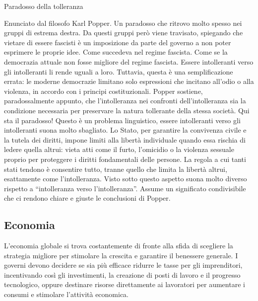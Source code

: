 \documentclass[12pt]{book} %
\begin{document}
\begin{mdframed}[linewidth=1pt]
Paradosso della tolleranza

Enunciato dal filosofo Karl Popper. Un paradosso che ritrovo molto spesso nei gruppi di estrema destra. Da questi
gruppi però viene travisato, spiegando che vietare di essere fascisti è un imposizione da parte del governo a non poter
esprimere le proprie idee. Come succedeva nel regime fascista. Come se la democrazia attuale non fosse migliore del
regime fascista. Essere intolleranti verso gli intolleranti li rende uguali a loro. 
Tuttavia, questa è una semplificazione errata: le moderne democrazie limitano solo espressioni che incitano all’odio o alla violenza, in accordo con i principi costituzionali.
Popper sostiene, paradossalmente appunto, che l'intolleranza nei confronti dell'intolleranza sia la condizione necessaria per preservare la natura tollerante della stessa società. Qui sta il paradosso! Questo è un problema linguistico, essere intolleranti verso gli intolleranti suona molto sbagliato. Lo Stato, per garantire la convivenza civile e la tutela dei diritti, impone limiti alla libertà individuale quando essa rischia di ledere quella altrui: vieta atti come il furto, l’omicidio o la violenza sessuale proprio per proteggere i diritti fondamentali delle persone. La regola a cui tanti stati tendono è consentire tutto, tranne quello che limita la libertà altrui, esattamente come l'intolleranza. Visto sotto questo aspetto suona molto diverso rispetto a “intolleranza verso l'intolleranza”. Assume un significato condivisibile che ci rendono chiare e giuste le conclusioni di Popper.
\end{mdframed}

\subsection{Economia}
L'economia globale si trova costantemente di fronte alla sfida di scegliere la strategia migliore per stimolare la crescita e garantire il benessere generale. I governi devono decidere se sia più efficace ridurre le tasse per gli imprenditori, incentivando così gli investimenti, la creazione di posti di lavoro e il progresso tecnologico, oppure destinare risorse direttamente ai lavoratori per aumentare i consumi e stimolare l'attività economica.
\end{document}
